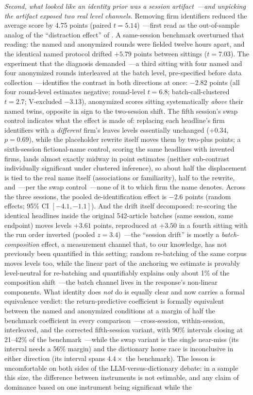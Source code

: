 \emph{Second, what looked like an identity prior was a session artifact~---and unpicking the artifact exposed two real level channels.} Removing firm identifiers reduced the average score by 4.75 points (paired $t=5.14$)~---first read as the out-of-sample analog of the ``distraction effect'' of \citet{glasserman2023}. A same-session benchmark overturned that reading: the named and anonymized rounds were fielded twelve hours apart, and the identical named protocol drifted $+5.79$ points between sittings ($t=7.03$). The experiment that the diagnosis demanded~---a third sitting with four named and four anonymized rounds interleaved at the batch level, pre-specified before data collection~---identifies the contrast in both directions at once: $-2.82$ points (all four round-level estimates negative; round-level $t=6.8$; batch-call-clustered $t=2.7$; V-excluded $-3.13$), anonymized scores sitting systematically \emph{above} their named twins, opposite in sign to the two-session shift. The fifth session's swap control indicates what the effect is made of: replacing each headline's firm identifiers with a \emph{different} firm's leaves levels essentially unchanged ($+0.34$, $p=0.69$), while the placeholder rewrite itself moves them by two-plus points; a sixth-session fictional-name control, scoring the same headlines with invented firms, lands almost exactly midway in point estimates (neither sub-contrast individually significant under clustered inference), so about half the displacement is tied to the real name itself (associations or familiarity), half to the rewrite, and~---per the swap control~---none of it to which firm the name denotes. Across the three sessions, the pooled de-identification effect is $-2.6$ points (random effects; 95\% CI $[-4.1, -1.1]$). And the drift itself decomposed: re-scoring the identical headlines inside the original 542-article batches (same session, same endpoint) moves levels $+3.61$ points, reproduced at $+3.50$ in a fourth sitting with the run order inverted (pooled $z=3.4$)~---the ``session drift'' is mostly a \emph{batch-composition} effect, a measurement channel that, to our knowledge, has not previously been quantified in this setting; random re-batching of the same corpus moves levels too, while the linear part of the anchoring we estimate is provably level-neutral for re-batching and quantifiably explains only about 1\% of the composition shift~---the batch channel lives in the response's non-linear components. What identity does \emph{not} do is equally clear and now carries a formal equivalence verdict: the return-predictive coefficient is formally equivalent between the named and anonymized conditions at a margin of half the benchmark coefficient in every comparison~---cross-session, within-session, interleaved, and the corrected fifth-session variant, with 90\% intervals closing at 21--42\% of the benchmark~---while the swap variant is the single near-miss (its interval needs a 56\% margin) and the dictionary horse race is inconclusive in either direction (its interval spans $4.4\times$ the benchmark). The lesson is uncomfortable on both sides of the LLM-versus-dictionary debate: in a sample this size, the difference between instruments is not estimable, and any claim of dominance based on one instrument being significant while the 
